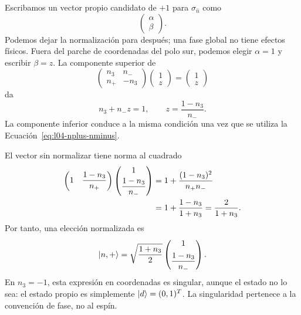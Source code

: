 Escribamos un vector propio candidato de \(+1\) para \(\sigma_{\hat n}\) como
\begin{equation}
  \begin{pmatrix}\alpha\\\beta\end{pmatrix}.
\end{equation}
Podemos dejar la normalización para después; una fase global no tiene efectos físicos. Fuera del parche de coordenadas del polo sur, podemos elegir \(\alpha=1\) y escribir \(\beta=z\). La componente superior de
\begin{equation}
  \begin{pmatrix}
    n_3&n_-\\
    n_+&-n_3
  \end{pmatrix}
  \begin{pmatrix}1\\z\end{pmatrix}
  =
  \begin{pmatrix}1\\z\end{pmatrix}
\end{equation}
da
\begin{equation}
  n_3+n_-z=1,
  \qquad
  z=\frac{1-n_3}{n_-}.
  \label{eq:l04-z-solution}
\end{equation}
La componente inferior conduce a la misma condición una vez que se utiliza la Ecuación~\eqref{eq:l04-nplus-nminus}.

El vector sin normalizar tiene norma al cuadrado
\begin{align}
  \begin{pmatrix}
    1&\dfrac{1-n_3}{n_+}
  \end{pmatrix}
  \begin{pmatrix}
    1\\[3pt]\dfrac{1-n_3}{n_-}
  \end{pmatrix}
  &=
  1+\frac{(1-n_3)^2}{n_+n_-}
  \notag\\
  &=
  1+\frac{1-n_3}{1+n_3}
  =
  \frac{2}{1+n_3}.
  \label{eq:l04-unnormalized-norm}
\end{align}
Por tanto, una elección normalizada es
\begin{equation}
  \left\lvert n,+\right\rangle
  =
  \sqrt{\frac{1+n_3}{2}}
  \begin{pmatrix}
    1\\[5pt]\dfrac{1-n_3}{n_-}
  \end{pmatrix}.
  \label{eq:l04-normalized-n-state}
\end{equation}
En \(n_3=-1\), esta expresión en coordenadas es singular, aunque el estado no lo sea: el estado propio es simplemente \(\left\lvert d\right\rangle=(0,1)^T\). La singularidad pertenece a la convención de fase, no al espín.

